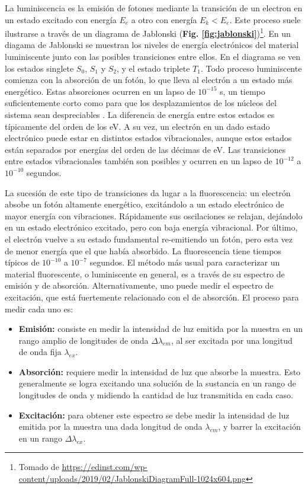 La luminiscencia es la emisión de fotones mediante la transición de un electron en un estado excitado con energía $E_e$ a otro con energía $E_k < E_e$.
Este proceso suele ilustrarse a través de un diagrama de Jablonski (\textbf{Fig. \ref{fig:jablonski}})\footnote{Tomado de \href{https://edinst.com/wp-content/uploads/2019/02/JablonskiDiagramFull-1024x604.png}{https://edinst.com/wp-content/uploads/2019/02/JablonskiDiagramFull-1024x604.png}}.
En un diagama de Jablonski se muestran los niveles de energía electrónicos del material luminiscente junto con las posibles transiciones entre ellos.
En el diagrama se ven los estados singlete $S_0$, $S_1$ y $S_2$, y el estado triplete $T_1$.
Todo proceso luminiscente comienza con la absorción de un fotón, lo que lleva al electrón a un estado más energético.
Estas absorciones ocurren en un lapso de $10^{-15}$ s, un tiempo suficientemente corto como para que los desplazamientos de los núcleos del sistema sean despreciables \cite{lakowicz_principles_2006}.
La diferencia de energía entre estos estados es típicamente del orden de los eV.
A su vez, un electrón en un dado estado electrónico puede estar en distintos estados vibracionales, aunque estos estados están separados por energías del orden de las décimas de eV.
Las transiciones entre estados vibracionales también son posibles y ocurren en un lapso de $10^{-12}$ a $10^{-10}$ segundos.

La sucesión de este tipo de transiciones da lugar a la fluorescencia: un electrón absobe un fotón altamente energético, excitándolo a un estado electrónico de mayor energía con vibraciones.
Rápidamente sus oscilaciones se relajan, dejándolo en un estado electrónico excitado, pero con baja energía vibracional.
Por último, el electrón vuelve a su estado fundamental re-emitiendo un fotón, pero esta vez de menor energía que el que había absorbido.
La fluorescencia tiene tiempos típicos de $10^{-10}$ a $10^{-7}$ segundos.
El método más usual para caracterizar un material fluorescente, o luminiscente en general, es a través de su espectro de emisión y de absorción.
Alternativamente, uno puede medir el espectro de excitación, que está fuertemente relacionado con el de absorción.
El proceso para medir cada uno es:

\begin{itemize}
    \item \textbf{Emisión:} consiste en medir la intensidad de luz emitida por la muestra en un rango amplio de longitudes de onda $\Delta \lambda_{em}$, al ser excitada por una longitud de onda fija $\lambda_{ex}$.
    \item \textbf{Absorción:} requiere medir la intensidad de luz que absorbe la muestra. Esto generalmente se logra excitando una solución de la sustancia en un rango de longitudes de onda y midiendo la cantidad de luz transmitida en cada caso.
    \item \textbf{Excitación:} para obtener este espectro se debe medir la intensidad de luz emitida por la muestra una dada longitud de onda $\lambda_{em}$, y barrer la excitación en un rango $\Delta \lambda_{ex}$.
\end{itemize}


